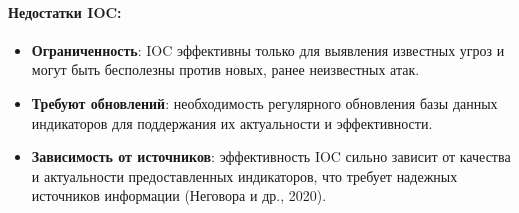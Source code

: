 \paragraph*{Недостатки IOC:}
\begin{itemize}
    \item \textbf{Ограниченность}: IOC эффективны только для выявления известных угроз и могут быть бесполезны против новых, ранее неизвестных атак.
    \item \textbf{Требуют обновлений}: необходимость регулярного обновления базы данных индикаторов для поддержания их актуальности и эффективности.
    \item \textbf{Зависимость от источников}: эффективность IOC сильно зависит от качества и актуальности предоставленных индикаторов, что требует надежных источников информации (Неговора и др., 2020).
\end{itemize}

